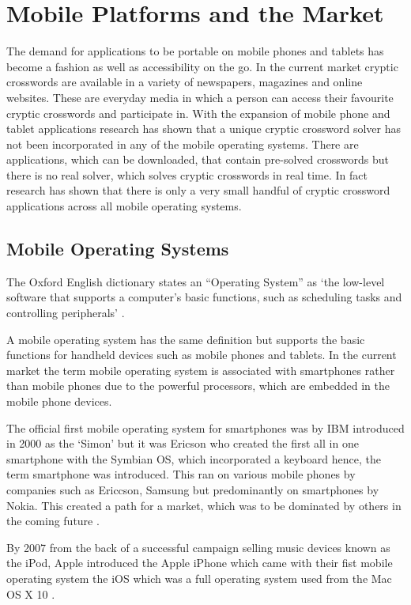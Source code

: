 \section{Mobile Platforms and the Market}

The demand for applications to be portable on mobile phones and tablets has
become a fashion as well as accessibility on the go. In the current market
cryptic crosswords are available in a variety of newspapers, magazines and
online websites. These are everyday media in which a person can access their
favourite cryptic crosswords and participate in. With the expansion of mobile
phone and tablet applications research has shown that a unique cryptic crossword
solver has not been incorporated in any of the mobile operating systems. There
are applications, which can be downloaded, that contain pre-solved crosswords but there is no real solver, which solves cryptic crosswords in real time. In fact research has shown that there is only a very small handful of cryptic crossword applications across all mobile operating systems.

\subsection{Mobile Operating Systems}

The Oxford English dictionary states an ``Operating System'' as `the low-level
software that supports a computer's basic functions, such as scheduling tasks
and controlling peripherals' \citep{oxford_dictionary11}.

A mobile operating system has the same definition but supports the basic
functions for handheld devices such as mobile phones and tablets. In the current
market the term mobile operating system is associated with smartphones rather
than mobile phones due to the powerful processors, which are embedded in the
mobile phone devices.

The official first mobile operating system for smartphones was by IBM introduced
in 2000 as the `Simon' but it was Ericson who created the first all in one
smartphone with the Symbian OS, which incorporated a keyboard hence, the term
smartphone was introduced. This ran on various mobile phones by companies such
as Ericcson, Samsung but predominantly on smartphones by Nokia. This created a
path for a market, which was to be dominated by others in the coming future
\citep{smartphone11}.

By 2007 from the back of a successful campaign selling music devices known as
the iPod, Apple introduced the Apple iPhone which came with their fist mobile
operating system the iOS which was a full operating system used from the Mac OS
X 10 \citep{macworld07}.

